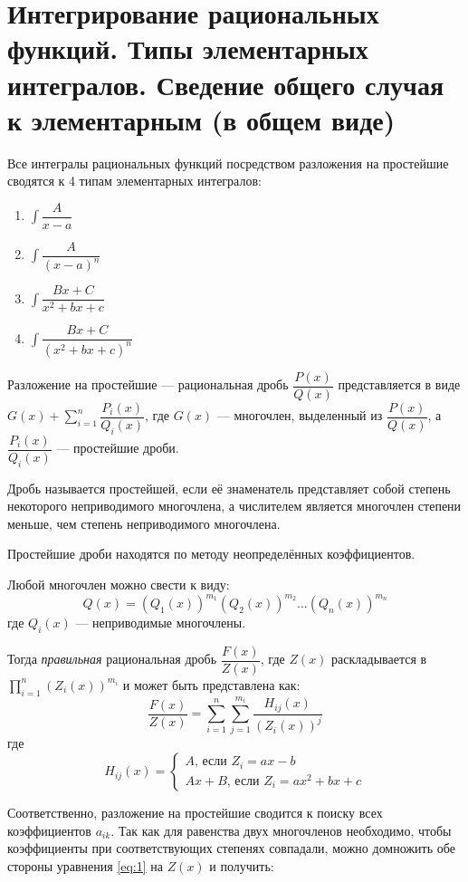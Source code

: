 \documentclass[12pt]{article}
\begin{document}
\section{Интегрирование рациональных функций. Типы элементарных интегралов. Сведение общего случая к элементарным (в общем виде)}
Все интегралы рациональных функций посредством разложения на простейшие сводятся к 4 типам элементарных интегралов:
\begin{enumerate}[label=\Roman*]
    \item $\displaystyle \int \dfrac{A}{x - a}$
    \item $\displaystyle \int \dfrac{A}{(x - a)^n}$
    \item $\displaystyle \int \dfrac{Bx + C}{x^2 + bx + c}$
    \item $\displaystyle \int \dfrac{Bx + C}{(x^2 + bx + c)^n}$
\end{enumerate}

Разложение на простейшие — рациональная дробь $\dfrac{P(x)}{Q(x)}$ представляется в виде $\displaystyle G(x) + \sum^n_{i=1}\dfrac{P_i(x)}{Q_i(x)}$, где $G(x)$ — многочлен, выделенный из $\dfrac{P(x)}{Q(x)}$, а $\dfrac{P_i(x)}{Q_i(x)}$ — простейшие дроби.

Дробь называется простейшей, если её знаменатель представляет собой степень некоторого неприводимого многочлена, а числителем является многочлен степени меньше, чем степень неприводимого многочлена.

Простейшие дроби находятся по методу неопределённых коэффициентов.

Любой многочлен можно свести к виду:
\[
    Q(x) = (Q_1(x))^{m_1}(Q_2(x))^{m_2}...(Q_n(x))^{m_n}
\]
где $Q_i(x)$ — неприводимые многочлены.

Тогда \textit{правильная} рациональная дробь $\dfrac{F(x)}{Z(x)}$, где $Z(x)$ раскладывается в $\displaystyle \prod_{i=1}^n(Z_i(x))^{m_i}$ и может быть представлена как:
\begin{equation}
    \dfrac{F(x)}{Z(x)} = \sum^n_{i=1} \sum^{m_i}_{j=1} \dfrac{H_{ij}(x)}{(Z_i(x))^{j}} \label{eq:1}
\end{equation}
где
\[
    H_{ij}(x) = \begin{cases}
        A \text{, если $Z_i = ax - b$} \\
        Ax + B \text{, если $Z_i = ax^2 + bx + c$}
    \end{cases}
\]

Соответственно, разложение на простейшие сводится к поиску всех коэффициентов $a_{ik}$. Так как для равенства двух многочленов необходимо, чтобы коэффициенты при соответствующих степенях совпадали, можно домножить обе стороны уравнения \eqref{eq:1} на $Z(x)$ и получить:
\end{document}
